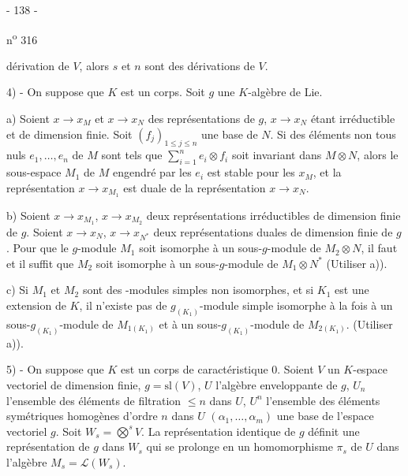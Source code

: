 \begin{center}- 138 -\end{center}
\hfill n\textsuperscript{o} 316

dérivation de $V$, alors $s$ et $n$ sont des dérivations de $V$.

4) - On suppose que $K$ est un corps. Soit $g$ une $K$-algèbre de Lie.

a) Soient $x\longrightarrow x_M$ et $x\longrightarrow x_N$ des représentations de $g$, $x\longrightarrow x_N$ étant irréductible et de dimension finie. Soit $(f_j)_{1\leq j\leq n}$ une base de $N$. Si des éléments non tous nuls $e_1,\ldots,e_n$ de $M$ sont tels que $\sum_{i=1}^{n}e_i\otimes f_i$ soit invariant dans $M\otimes N$, alors le sous-espace $M_1$ de $M$ engendré par les $e_i$ est stable pour les $x_M$, et la représentation $x\longrightarrow x_{M_1}$ est duale de la représentation $x\longrightarrow x_N$.

b) Soient $x\longrightarrow x_{M_1}$, $x\longrightarrow x_{M_2}$ deux représentations irréductibles de dimension finie de $g$. Soient $x\longrightarrow x_N$, $x\longrightarrow x_{N^*}$ deux représentations duales de dimension finie de $g$. Pour que le $g$-module $M_1$ soit isomorphe à un sous-$g$-module de $M_2\otimes N$, il faut et il suffit que $M_2$ soit isomorphe à un sous-$g$-module de $M_1\otimes N^*$ (Utiliser a)).

c) Si $M_1$ et $M_2$ sont des -modules simples non isomorphes, et si $K_1$ est une extension de $K$, il n'existe pas de $g_{(K_1)}$-module simple isomorphe à la fois à un sous-$g_{(K_1)}$-module de $M_{1(K_1)}$ et à un sous-$g_{(K_1)}$-module de $M_{2(K_1)}$. (Utiliser a)).

\margin{\P}
5) - On suppose que $K$ est un corps de caractéristique $0$. Soient $V$ un $K$-espace vectoriel de dimension finie, $g=\mathrm{sl}(V)$, $U$ l'algèbre enveloppante de $g$, $U_n$ l'ensemble des éléments de filtration $\leq n$ dans $U$, $U^n$ l'ensemble des éléments symétriques homogènes d'ordre $n$ dans $U$ $(\alpha_1,\ldots,\alpha_m)$ une base de l'espace vectoriel $g$. Soit $W_s=\overset{s}{\bigotimes}V$. La représentation identique de $g$ définit une représentation de $g$ dans $W_s$ qui se prolonge en un homomorphisme $\pi_s$ de $U$ dans l'algèbre $M_s=\mathcal L(W_s)$.


